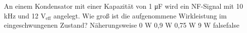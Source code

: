     {An einem Kondensator mit einer Kapazität von 1 \si{\micro\farad} wird ein NF-Signal mit 10 kHz und 12 V$_{\textrm{eff}}$ angelegt. Wie groß ist die aufgenommene Wirkleistung im eingeschwungenen Zustand?}
    {Näherungsweise 0 W}
    {0,9 W}
    {0,75 W}
    {9 W}
    {false}{false}